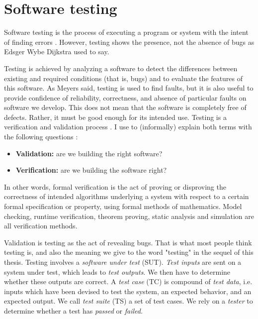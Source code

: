 \section{Software testing}
\label{sec:related:testing}

Software testing is the process of executing a program or system
with the intent of finding errors \cite{Myers:1979:AST:539883}.
However, testing shows the presence, not the absence of bugs as
Edsger Wybe Dijkstra used to say.

Testing is achieved by analyzing a software to detect the
differences between existing and required conditions (that is,
bugs) and to evaluate the features of this software. As Meyers
said, testing is used to find faults, but it is also useful to
provide confidence of reliability, correctness, and absence of
particular faults on software we develop. This does not mean that
the software is completely free of defects. Rather, it must be
good enough for its intended use.
Testing is a verification and validation process
\cite{wallace1989software}. I use to (informally) explain both
terms with the following questions \cite{Boehm1979}:

\begin{itemize}
\item \textbf{Validation:} are we building the right software?
\item \textbf{Verification:} are we building the software right?
\end{itemize}

In other words, formal verification is the act of proving or
disproving the correctness of intended algorithms underlying a
system with respect to a certain formal specification or
property, using formal methods of mathematics. Model checking,
runtime verification, theorem proving, static analysis and
simulation are all verification methods.

Validation is testing as the act of revealing bugs. That is what
most people think testing is, and also the meaning we give to the
word "testing" in the sequel of this thesis. Testing involves a
\textit{software under test} (SUT). \textit{Test inputs} are sent
on a system under test, which leads to \textit{test outputs}. We
then have to determine whether these outputs are correct. A
\textit{test case} (TC) is compound of \textit{test data}, i.e.
inputs which have been devised to test the system, an expected
behavior, and an expected output. We call \textit{test suite}
(TS) a set of test cases. We rely on a \textit{tester} to
determine whether a test has \textit{passed} or \textit{failed}.

